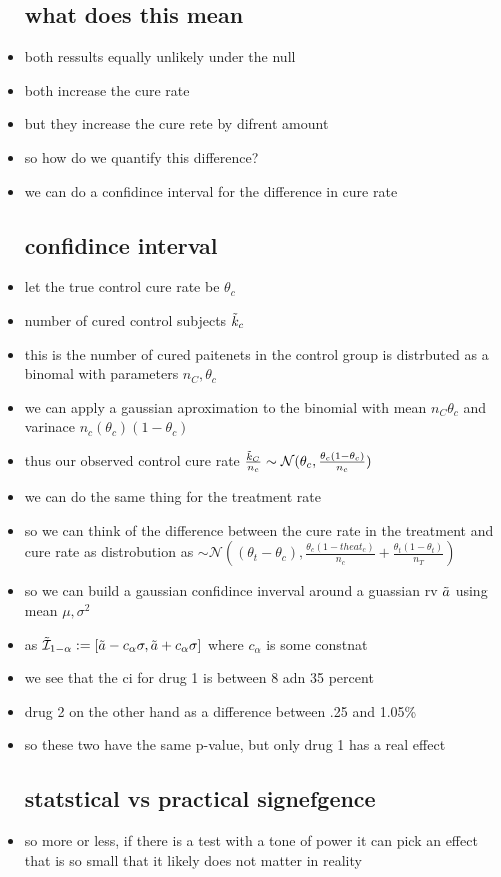 \documentclass{article}
\begin{document}
\begin{itemize}
\subsection*{what does this mean}
\item both ressults equally unlikely under the null 
\item both increase the cure rate 
\item but they increase the cure rete by difrent amount 
\item so how do we quantify this difference?
\item we can do a confidince interval for the difference in cure rate 
\subsection*{confidince interval}
\item let the true control cure rate be $\theta_{c}$
\item number of cured control subjects $\Tilde{k}_{c}$
\item this is the number of cured paitenets in the control group is distrbuted as a binomal with parameters $n_{C}, \theta_c$
\item we can apply a gaussian aproximation to the binomial with mean $n_{C}\theta_{c}$ and varinace $n_c(\theta_c)(1-\theta_c)$ 
\item thus our observed control cure rate $\frac{\Tilde{k}_{C}}{n_{c}}\sim \mathcal{N}(\theta_c, \frac{\theta_c(1-\theta_c)}{n_c})$
\item we can do the same thing for the treatment rate 
\item so we can think of the difference between the cure rate in the treatment and cure rate as distrobution as $\sim \mathcal{N}((\theta_t-\theta_c), \frac{\theta_c(1-theat_c)}{n_c}+\frac{\theta_t(1-\theta_t)}{n_T})$
\item so we can build a gaussian confidince inverval around a guassian rv $\Tilde{a}$ using mean $\mu, \sigma^2$
\item as $\Tilde{\mathcal{I}}_{1-\alpha}:=[\Tilde{a}-c_{\alpha}\sigma,\Tilde{a}+c_{\alpha}\sigma ]$ where $c_{\alpha}$ is some constnat 
\item we see that the ci for drug 1 is between 8 adn 35 percent 
\item drug 2 on the other hand as a difference between .25 and 1.05\%
\item so these two have the same p-value, but only drug 1 has a real effect
\subsection*{statstical vs practical signefgence}
\item so more or less, if there is a test with a tone of power it can pick an effect that is so small that it likely does not matter in reality

\end{itemize}
\end{document}
